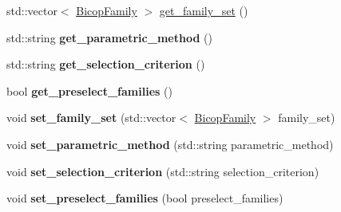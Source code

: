 \begin{DoxyCompactItemize}
\item 
std\+::vector$<$ \hyperlink{namespacevinecopulib_a42e95cc06d33896199caab0c11ad44f3}{Bicop\+Family} $>$ \hyperlink{classvinecopulib_1_1_controls_bicop_a1e930543d95446b957921025a64c2b62}{get\+\_\+family\+\_\+set} ()
\item 
std\+::string {\bfseries get\+\_\+parametric\+\_\+method} ()\hypertarget{classvinecopulib_1_1_controls_bicop_a08574a264fc2f56c41d47690421c8e8e}{}\label{classvinecopulib_1_1_controls_bicop_a08574a264fc2f56c41d47690421c8e8e}

\item 
std\+::string {\bfseries get\+\_\+selection\+\_\+criterion} ()\hypertarget{classvinecopulib_1_1_controls_bicop_a3cf10e8bc508942f1993d12e7364788a}{}\label{classvinecopulib_1_1_controls_bicop_a3cf10e8bc508942f1993d12e7364788a}

\item 
bool {\bfseries get\+\_\+preselect\+\_\+families} ()\hypertarget{classvinecopulib_1_1_controls_bicop_a65a3a2427c98f76db069dfb18c7a63b8}{}\label{classvinecopulib_1_1_controls_bicop_a65a3a2427c98f76db069dfb18c7a63b8}

\item 
void {\bfseries set\+\_\+family\+\_\+set} (std\+::vector$<$ \hyperlink{namespacevinecopulib_a42e95cc06d33896199caab0c11ad44f3}{Bicop\+Family} $>$ family\+\_\+set)\hypertarget{classvinecopulib_1_1_controls_bicop_ac145c87e090e471c6558b3f44cf13c6c}{}\label{classvinecopulib_1_1_controls_bicop_ac145c87e090e471c6558b3f44cf13c6c}

\item 
void {\bfseries set\+\_\+parametric\+\_\+method} (std\+::string parametric\+\_\+method)\hypertarget{classvinecopulib_1_1_controls_bicop_aae1e22aa42d6bcc5081daead7b811960}{}\label{classvinecopulib_1_1_controls_bicop_aae1e22aa42d6bcc5081daead7b811960}

\item 
void {\bfseries set\+\_\+selection\+\_\+criterion} (std\+::string selection\+\_\+criterion)\hypertarget{classvinecopulib_1_1_controls_bicop_aeccd3554a8fb77e313355f83d5ad408b}{}\label{classvinecopulib_1_1_controls_bicop_aeccd3554a8fb77e313355f83d5ad408b}

\item 
void {\bfseries set\+\_\+preselect\+\_\+families} (bool preselect\+\_\+families)\hypertarget{classvinecopulib_1_1_controls_bicop_a01ba502be3814161534ee2e657cfeddb}{}\label{classvinecopulib_1_1_controls_bicop_a01ba502be3814161534ee2e657cfeddb}

\end{DoxyCompactItemize}



